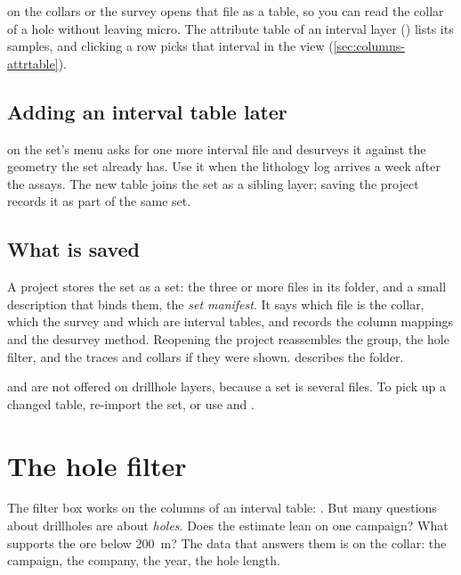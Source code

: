  on the collars or the survey opens that file as a table, so you can read the collar of a hole without leaving micro. The attribute table of an interval layer () lists its samples, and clicking a row picks that interval in the view (\cref{sec:columns-attrtable}).

\subsection{Adding an interval table later}

 on the set's menu asks for one more interval file and desurveys it against the geometry the set already has. Use it when the lithology log arrives a week after the assays. The new table joins the set as a sibling layer; saving the project records it as part of the same set.

\subsection{What is saved}

A project stores the set as a set: the three or more files in its  folder, and a small description that binds them, the \emph{set manifest}. It says which file is the collar, which the survey and which are interval tables, and records the column mappings and the desurvey method. Reopening the project reassembles the group, the hole filter, and the traces and collars if they were shown.  describes the folder.

\begin{note}
 and  are not offered on drillhole layers, because a set is several files. To pick up a changed table, re-import the set, or use  and .
\end{note}

\section{The hole filter}\label{sec:dh-holefilter}

The filter box works on the columns of an interval table: . But many questions about drillholes are about \emph{holes}. Does the estimate lean on one campaign? What supports the ore below 200~m? The data that answers them is on the collar: the campaign, the company, the year, the hole length.

